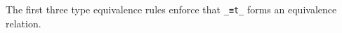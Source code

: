 \documentclass[authoryear, acmsmall, screen, review, nonacm]{acmart} %
\begin{document}
The first three type equivalence rules enforce that \verb!_≡t_! forms an equivalence relation.
\begin{code}%
\>[0]\AgdaSpace{}%
\AgdaSpace{}%
\<%
\\
\>[0][@{}l@{\AgdaIndent{0}}]%
\>[4]\AgdaSpace{}%
\AgdaSymbol{:}\AgdaSpace{}%
\AgdaSpace{}%
\AgdaSpace{}%
\<%
\\
%
\>[4]\AgdaSpace{}%
\AgdaSymbol{:}\AgdaSpace{}%
\AgdaSpace{}%
\AgdaSpace{}%
\AgdaSpace{}%
\AgdaSpace{}%
\AgdaSpace{}%
\AgdaSpace{}%
\<%
\\
%
\>[4]\AgdaSpace{}%
\AgdaSymbol{:}\AgdaSpace{}%
\AgdaSpace{}%
\AgdaSpace{}%
\AgdaSpace{}%
\AgdaSpace{}%
\AgdaSpace{}%
\AgdaSpace{}%
\AgdaSpace{}%
\AgdaSpace{}%
\AgdaSpace{}%
\AgdaSpace{}%
\<%
\end{code} 
\end{document}
